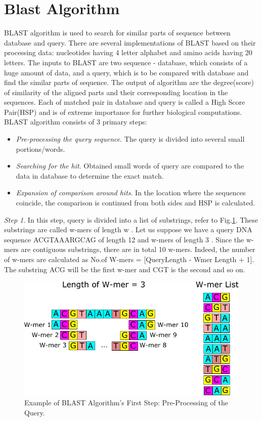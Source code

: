\section{Blast Algorithm}
\label{sec:blast}

BLAST algorithm is used to search for similar parts of sequence between database and query. There are several implementations of BLAST based on their processing data: nucleotides having 4 letter alphabet and amino acids having 20 letters. The inputs to BLAST are two sequence - database, which consists of a huge amount of data, and a query, which is to be compared with database and find the similar parts of sequence. The output of algorithm are the degree(score) of similarity of the aligned parts and their corresponding location in the sequences. Each of matched pair in database and query is called a High Score Pair(HSP) and is of extreme importance for further biological computations. BLAST algorithm consists of 3 primary steps:
\begin{itemize}
\item{\textit{Pre-processing the query sequence}. The query is divided into several small portions/words.} 
\item{\textit{Searching for the hit}. Obtained small words of query are compared to the data in database to determine the exact match.}
\item{\textit{Expansion of comparison around hits}. In the location where the sequences coincide, the comparison is continued from both sides and HSP is calculated.}
\end{itemize}

\textit{Step 1}. In this step, query is divided into a list of substrings, refer to Fig.\ref{fig:step1}. These substrings are called w-mers of length w \cite{sotiriades2007design}. Let us suppose we have a query DNA sequence ACGTAAARGCAG of length 12 and w-mers of length 3 \cite{sotiriades2007design}. Since the w-mers are contiguous substrings, there are in total 10 w-mers. Indeed, the number of w-mers are calculated as No.of W-mers = [QueryLength - Wmer Length + 1]. The substring ACG will be the first w-mer and CGT is the second and so on. 

\begin{figure}
\includegraphics[width=\textwidth]{Figures/Algorithm1.pdf}
\caption{Example of BLAST Algorithm's First Step: Pre-Processing of the Query.} \label{fig:step1}
\end{figure}

